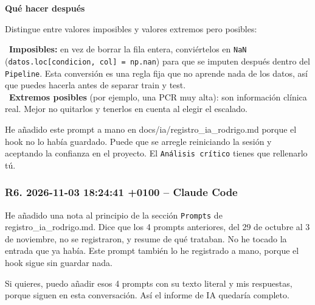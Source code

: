 \documentclass[11pt,a4paper]{article}
\begin{document}
{\textbf{Qué hacer después}

Distingue entre valores imposibles y valores extremos pero posibles:

\hspace*{1.0em}\textbullet~\textbf{Imposibles:} en vez de borrar la fila entera, conviértelos en \texttt{NaN} (\texttt{datos.loc[condicion, col] = np.nan}) para que se imputen después dentro del \texttt{Pipeline}. Esta conversión es una regla fija que no aprende nada de los datos, así que puedes hacerla antes de separar train y test. \\{}
\hspace*{1.0em}\textbullet~\textbf{Extremos posibles} (por ejemplo, una PCR muy alta): son información clínica real. Mejor no quitarlos y tenerlos en cuenta al elegir el escalado.

He añadido este prompt a mano en docs/\allowbreak{}ia/\allowbreak{}registro\_\allowbreak{}ia\_\allowbreak{}rodrigo.md porque el hook no lo había guardado. Puede que se arregle reiniciando la sesión y aceptando la confianza en el proyecto. El \texttt{Análisis crítico} tienes que rellenarlo tú.

}

\subsubsection*{R6. 2026-11-03 18:24:41 +0100 -- Claude Code}
{\small
He añadido una nota al principio de la sección \texttt{Prompts} de registro\_\allowbreak{}ia\_\allowbreak{}rodrigo.md. Dice que los 4 prompts anteriores, del 29 de octubre al 3 de noviembre, no se registraron, y resume de qué trataban. No he tocado la entrada que ya había. Este prompt también lo he registrado a mano, porque el hook sigue sin guardar nada.

Si quieres, puedo añadir esos 4 prompts con su texto literal y mis respuestas, porque siguen en esta conversación. Así el informe de IA quedaría completo.

}
\end{document}
